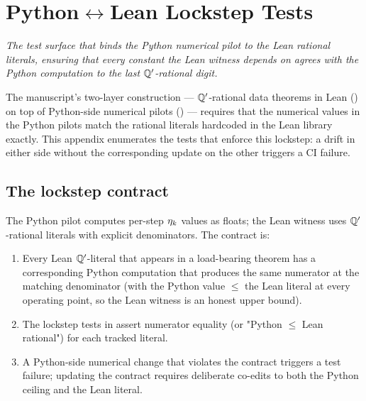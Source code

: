 
\chapter{Python$\leftrightarrow$Lean Lockstep Tests}
\label{ch:appx-lockstep}

\noindent\emph{The test surface that binds the Python numerical
pilot to the Lean rational literals, ensuring that every constant
the Lean witness depends on agrees with the Python computation to
the last $\mathbb{Q}'$-rational digit.}

The manuscript's two-layer construction --- $\mathbb{Q}'$-rational data
theorems in Lean () on top of Python-side
numerical pilots () --- requires that the
numerical values in the Python pilots match the rational literals
hardcoded in the Lean library exactly.  This appendix enumerates
the tests that enforce this lockstep: a drift in either side
without the corresponding update on the other triggers a CI
failure.

\section{The lockstep contract}
\label{sec:lockstep-contract}

%

The Python pilot computes per-step $\eta_k$ values as floats; the
Lean witness uses $\mathbb{Q}'$-rational literals with explicit
denominators.  The contract is:

\begin{enumerate}[label=(L\arabic*)]
  \item Every Lean $\mathbb{Q}'$-literal that appears in a load-bearing
    theorem has a corresponding Python computation that produces
    the same numerator at the matching denominator (with the
    Python value $\le$ the Lean literal at every operating point,
    so the Lean witness is an honest upper bound).
  \item The lockstep tests in 
    assert numerator equality (or "Python $\le$ Lean rational")
    for each tracked literal.
  \item A Python-side numerical change that violates the contract
    triggers a test failure; updating the contract requires
    deliberate co-edits to both the Python ceiling and the Lean
    literal.
\end{enumerate}

